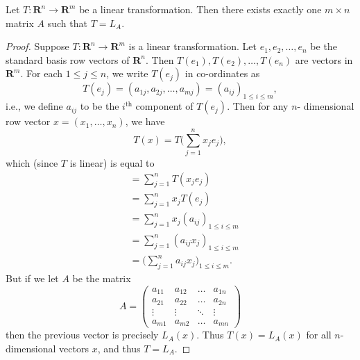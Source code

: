 \setcounter{theorem}{12}
\begin{lemma}\label{6.1.13}
    Let \(T : \mathbf{R}^n \to \mathbf{R}^m\) be a linear transformation.
    Then there exists exactly one \(m \times n\) matrix \(A\) such that \(T = L_A\).
\end{lemma}

\begin{proof}
    Suppose \(T : \mathbf{R}^n \to \mathbf{R}^m\) is a linear transformation.
    Let \(e_1, e_2, \dots, e_n\) be the standard basis row vectors of \(\mathbf{R}^n\).
    Then \(T(e_1), T(e_2), \dots, T(e_n)\) are vectors in \(\mathbf{R}^m\).
    For each \(1 \leq j \leq n\), we write \(T(e_j)\) in co-ordinates as
    \[
        T(e_j) = (a_{1j}, a_{2j}, \dots, a_{mj}) = (a_{ij})_{1 \leq i \leq m},
    \]
    i.e., we define \(a_{ij}\) to be the \(i^{\text{th}}\) component of \(T(e_j)\).
    Then for any \(n\)- dimensional row vector \(x = (x_1, \dots, x_n)\), we have
    \[
        T(x) = T\bigg(\sum_{j = 1}^n x_j e_j\bigg),
    \]
    which (since \(T\) is linear) is equal to
    \begin{align*}
         & = \sum_{j = 1}^n T(x_j e_j)                                \\
         & = \sum_{j = 1}^n x_j T(e_j)                                \\
         & = \sum_{j = 1}^n x_j (a_{ij})_{1 \leq i \leq m}            \\
         & = \sum_{j = 1}^n (a_{ij} x_j)_{1 \leq i \leq m}            \\
         & = \bigg(\sum_{j = 1}^n a_{ij} x_j\bigg)_{1 \leq i \leq m}.
    \end{align*}
    But if we let \(A\) be the matrix
    \[
        A = \begin{pmatrix}
            a_{11} & a_{12} & \dots  & a_{1n} \\
            a_{21} & a_{22} & \dots  & a_{2n} \\
            \vdots & \vdots & \ddots & \vdots \\
            a_{m1} & a_{m2} & \dots  & a_{mn}
        \end{pmatrix}
    \]
    then the previous vector is precisely \(L_A(x)\).
    Thus \(T(x) = L_A(x)\) for all \(n\)-dimensional vectors \(x\), and thus \(T = L_A\).


\end{proof}
